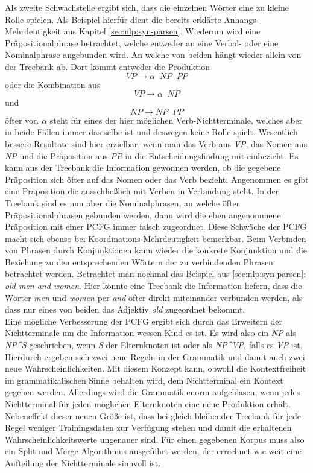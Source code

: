 Als zweite Schwachstelle ergibt sich, dass die einzelnen Wörter eine zu kleine Rolle spielen. Als Beispiel hierfür dient die bereits erklärte Anhangs-Mehrdeutigkeit aus Kapitel \ref{sec:nlp:syn-parsen}. Wiederum wird eine Präpositionalphrase betrachtet, welche entweder an eine Verbal- oder eine Nominalphrase angebunden wird. An welche von beiden hängt wieder allein von der Treebank ab. Dort kommt entweder die Produktion \[ VP  \to  \alpha \;\;  NP \;\; PP \] oder die Kombination aus \[ VP  \to  \alpha \;\; NP \] und \[ NP  \to  NP \;\; PP \] öfter vor. \( \alpha \) steht für eines der hier möglichen Verb-Nichtterminale, welches aber in beide Fällen immer das selbe ist und deswegen keine Rolle spielt. Wesentlich bessere Resultate sind hier erzielbar, wenn man das Verb aus \textit{VP}, das Nomen aus \textit{NP} und die Präposition aus \textit{PP} in die Entscheidungsfindung mit einbezieht. Es kann aus der Treebank die Information gewonnen werden, ob die gegebene Präposition sich öfter auf das Nomen oder das Verb bezieht. Angenommen es gibt eine Präposition die ausschließlich mit Verben in Verbindung steht. In der Treebank sind es nun aber die Nominalphrasen, an welche öfter Präpositionalphrasen gebunden werden, dann wird die eben angenommene Präposition mit einer PCFG immer falsch zugeordnet. Diese Schwäche der PCFG macht sich ebenso bei Koordinations-Mehrdeutigkeit bemerkbar. Beim Verbinden von Phrasen durch Konjunktionen kann wieder die konkrete Konjunktion und die Beziehung zu den entsprechenden Wörtern der zu verbindenden Phrasen betrachtet werden. Betrachtet man nochmal das Beispiel aus \ref{sec:nlp:syn-parsen}: \textit{old men and women}. Hier könnte eine Treebank die Information liefern, dass die Wörter \textit{men} und \textit{women} per \textit{and} öfter direkt miteinander verbunden werden, als dass nur eines von beiden das Adjektiv \textit{old} zugeordnet bekommt. \\
Eine mögliche Verbesserung der PCFG ergibt sich durch das Erweitern der Nichtterminale um die Information wessen Kind es ist. Es wird also ein \textit{NP} als \textit{NP\^{}S} geschrieben, wenn \textit{S} der Elternknoten ist oder als \textit{NP\^{}VP}, falls es \textit{VP} ist. Hierdurch ergeben sich zwei neue Regeln in der Grammatik und damit auch zwei neue Wahrscheinlichkeiten. Mit diesem Konzept kann, obwohl die Kontextfreiheit im grammatikalischen Sinne behalten wird, dem Nichtterminal ein Kontext gegeben werden. Allerdings wird die Grammatik enorm aufgeblasen, wenn jedes Nichtterminal für jeden möglichen Elternknoten eine neue Produktion erhält. Nebeneffekt dieser neuen Größe ist, dass bei gleich bleibender Treebank für jede Regel weniger Trainingsdaten zur Verfügung stehen und damit die erhaltenen Wahrscheinlichkeitswerte ungenauer sind. Für einen gegebenen Korpus muss also ein Split und Merge Algorithmus ausgeführt werden, der errechnet wie weit eine Aufteilung der Nichtterminale sinnvoll ist. 

